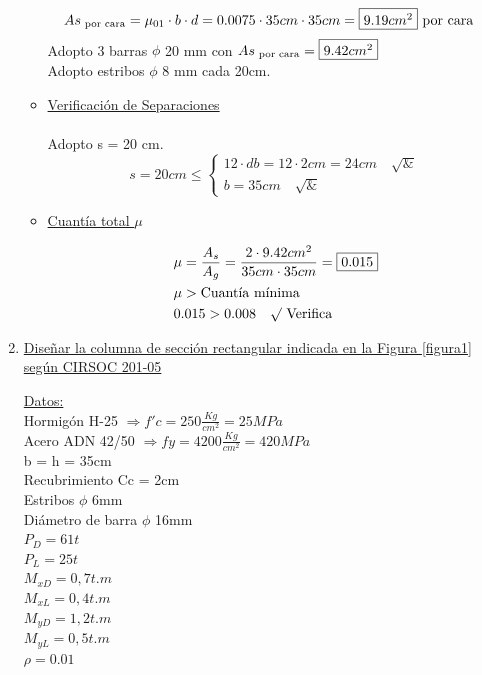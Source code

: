 \begin{enumerate}
\begin{itemize}
\begin{align*}
& As_{\text{ por cara}} = \mu_{01} \cdot b \cdot d = 0.0075 \cdot 35cm \cdot 35cm = \framebox{$9.19cm^2$} \text{ por cara}
\end{align*}
Adopto 3 barras $\phi$ 20 mm con $As_{\text{ por cara}}=\framebox{$9.42cm^2$}$\\
Adopto estribos $\phi$ 8 mm cada 20cm.\\

\item \underline{Verificación de Separaciones}\\
\\
Adopto s = 20 cm.\\
\[ s = 20cm \leq \left\{ \begin{array}{ll}
         12 \cdot db = 12 \cdot 2cm = 24cm \quad \surd &\\
         b = 35cm \quad \surd & \end{array} \right. \] 

\item \underline{Cuantía total $\mu$}

\begin{align*}
& \mu = \frac{A_s}{A_g} = \frac{2 \cdot 9.42cm^2}{35cm \cdot 35cm} = \framebox{0.015} \\
& \mu > \text{Cuantía mínima} \\
& 0.015 > 0.008 \quad \surd \text{ Verifica}
\end{align*}
\end{itemize}
\newpage
\item \underline{Diseñar la columna de sección rectangular indicada en la Figura \ref{figura1} según CIRSOC 201-05}

\underline{Datos:}\\
Hormigón H-25 $\Rightarrow f'c = 250 \frac{Kg}{cm^2} = 25 MPa$\\
Acero ADN 42/50 $\Rightarrow fy = 4200 \frac{Kg}{cm^2} = 420 MPa$\\
b = h = 35cm\\
Recubrimiento Cc = 2cm\\
Estribos $\phi$ 6mm\\
Diámetro de barra $\phi$ 16mm\\
$P_D = 61 t$\\
$P_L = 25 t$\\
$M_{xD} = 0,7 t.m$\\
$M_{xL} = 0,4 t.m$\\
$M_{yD} = 1,2 t.m$\\
$M_{yL} = 0,5 t.m$\\
$\rho = 0.01$\\


\end{enumerate}
